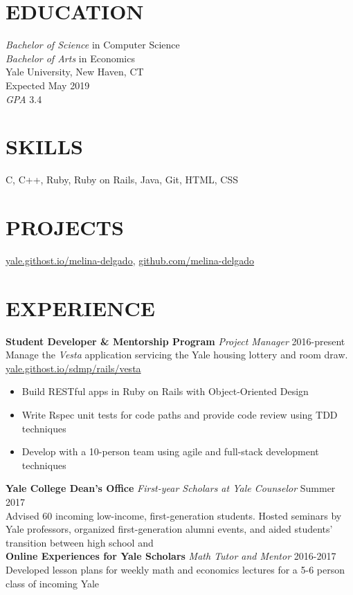 \documentclass[margin, centered]{res}
\begin{document}
\address{130 Prospect Street | New Haven, CT 06511 | (954) 682-8999 | melina.delgado@yale.edu}

\begin{resume}
  \section{EDUCATION}
  \textit{Bachelor of Science} in Computer Science \\
  \textit{Bachelor of Arts} in Economics \\
  Yale University, New Haven, CT \\
  Expected May 2019 \\
  \textit{GPA} 3.4

  \section{SKILLS}
  C, C++, Ruby, Ruby on Rails, Java, Git, HTML, CSS
  
  \section{PROJECTS}
  \href{http://yale.githost.io/melina-delgado}{yale.githost.io/melina-delgado},  
  \href{http://github.com/melina-delgado}{github.com/melina-delgado}

  \section{EXPERIENCE}
  \textbf{Student Developer \&  Mentorship Program} \textit{Project Manager} \hfill 2016-present \\
  Manage the \textit{Vesta} application servicing the Yale housing lottery and room draw. \\ 
  \href{yale.githost.io/sdmp/rails/vesta}{yale.githost.io/sdmp/rails/vesta}\smallskip{}
  \begin{itemize}
    \item Build RESTful apps in Ruby on Rails with Object-Oriented Design
    \item Write Rspec unit tests for code paths and provide code review using TDD techniques
    \item Develop with a 10-person team using agile and full-stack development techniques
  \end{itemize}
  \textbf{Yale College Dean's Office} \textit{First-year Scholars at Yale Counselor} \hfill Summer 2017 \\
  Advised 60 incoming low-income, first-generation students. Hosted seminars by Yale professors, organized first-generation alumni events, and aided students' transition between high school and  \\
  \textbf{Online Experiences for Yale Scholars} \textit{Math Tutor and Mentor} \hfill 2016-2017 \\
  Developed lesson plans for weekly math and economics lectures for a 5-6 person class of incoming Yale 


\end{resume}
\end{document}

